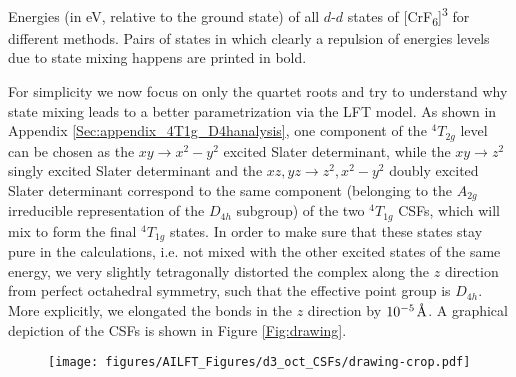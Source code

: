 \begin{table}
\small
\centering
\ttabbox
{\caption[Energies of all $d$-$d$ states of {[CrF\textsubscript{6}]}\textsuperscript{3\textminus}.]{Energies (in eV, relative to the ground state) of all $d$-$d$ states of [CrF\textsubscript{6}]\textsuperscript{3\textminus} for different methods. Pairs of states in which clearly a repulsion of energies levels due to state mixing happens are printed in bold.}
\label{Tab:CrF6_energies}}
{}
\end{table}

For simplicity we now focus on only the quartet roots and try to understand why state mixing leads to a better parametrization via the LFT model. As shown in Appendix \ref{Sec:appendix_4T1g_D4hanalysis}, one component of the $^4T_{2g}$ level can be chosen as the $xy\rightarrow x^2-y^2$ excited Slater determinant, while the $xy\rightarrow z^2$ singly excited Slater determinant and the $xz,yz\rightarrow z^2,x^2-y^2$ doubly excited Slater determinant correspond to the same component (belonging to the $A_{2g}$ irreducible representation of the $D_{4h}$ subgroup) of the two $^4T_{1g}$ CSFs, which will mix to form the final $^4T_{1g}$ states. In order to make sure that these states stay pure in the calculations, i.e. not mixed with the other excited states of the same energy, we very slightly tetragonally distorted the complex along the $z$ direction from perfect octahedral symmetry, such that the effective point group is $D_{4h}$. More explicitly, we elongated the bonds in the $z$ direction by ${10^{ - 5}}{\mkern 1mu} {\mkern 1mu} {\text{{\AA}}}$. A graphical depiction of the CSFs is shown in Figure \ref{Fig:drawing}.
 \begin{figure}
{\texttt{[image: figures/AILFT\_Figures/d3\_oct\_CSFs/drawing-crop.pdf]}}
\end{figure}

